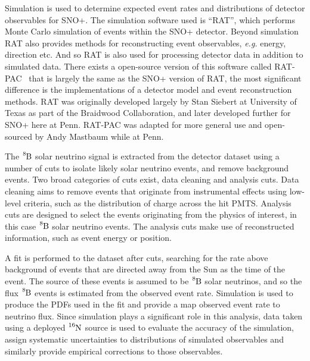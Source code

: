Simulation is used to determine expected event rates and distributions of
detector observables for SNO+.
The simulation software used is ``RAT'', which performs Monte Carlo
simulation of events within the SNO+ detector.
Beyond simulation RAT also provides methods for reconstructing event
observables, \textit{e.g.} energy, direction etc.
And so RAT is also used for processing detector data in addition
to simulated data.
There exists a open-source version of this software called
RAT-PAC~\cite{ratpac} that is largely the same as the SNO+ version of RAT,
the most significant difference is the implementations of a detector model
and event reconstruction methods.
RAT was originally developed largely by Stan Siebert at University of Texas as part of
the Braidwood Collaboration, and later developed further for SNO+ here at Penn.
RAT-PAC was adapted for more general use and open-sourced by Andy Mastbaum while at Penn.

The $\ce{^{8}B}$ solar neutrino signal is extracted from the detector dataset
using a number of cuts to isolate likely solar neutrino events, and remove
background events.
Two broad categories of cuts exist, data cleaning and analysis cuts.
Data cleaning aims to remove events that originate from instrumental effects using
low-level criteria, such as the distribution of charge across the hit PMTS\@.
Analysis cuts are designed to select the events originating from the physics of
interest, in this case $\ce{^{8}B}$ solar neutrino events.
The analysis cuts make use of reconstructed information, such as event energy
or position.

A fit is performed to the dataset after cuts, searching for the rate above background of events
that are directed away from the Sun as the time of the event.
The source of these events is assumed to be $\ce{^{8}B}$ solar neutrinos, and
so the flux $\ce{^{8}B}$ events is estimated from the observed event rate.
Simulation is used to produce the PDFs used in the fit and provide a map observed
event rate to neutrino flux.
Since simulation plays a significant role in this analysis, data taken using
a deployed $\ce{^{16}N}$ source is used to evaluate the accuracy of the
simulation, assign systematic uncertainties to distributions of simulated observables
and similarly provide empirical corrections to those observables.

